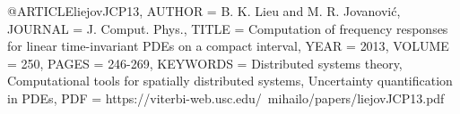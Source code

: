 @ARTICLE{liejovJCP13,
   AUTHOR       = {B. K. Lieu and M. R. Jovanovi\'c},
   JOURNAL      = {J. Comput. Phys.},
   TITLE        = {Computation of frequency responses for linear time-invariant {PDEs} on a compact interval},
   YEAR         = {2013},
   VOLUME = {250},
   PAGES = {246-269},
   KEYWORDS     = {Distributed systems theory, Computational tools for spatially distributed systems, Uncertainty quantification in PDEs},
   PDF          = {https://viterbi-web.usc.edu/~mihailo/papers/liejovJCP13.pdf}    
   }